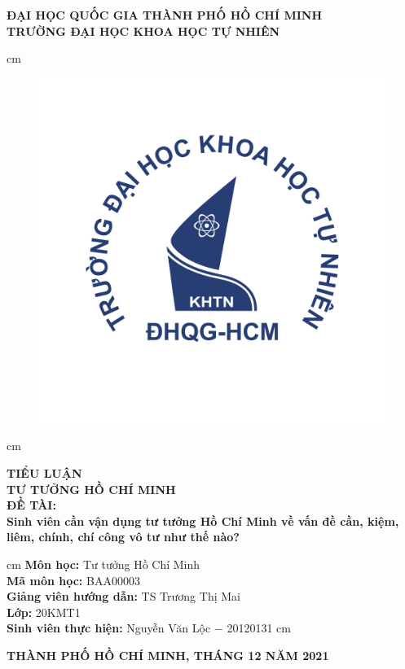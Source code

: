 \begin{titlepage}
\begin{mybox}
\begin{center}
\fontsize{12}{12}\selectfont
\textbf{ĐẠI HỌC QUỐC GIA THÀNH PHỐ HỒ CHÍ MINH}\\
\textbf{TRƯỜNG ĐẠI HỌC KHOA HỌC TỰ NHIÊN}
\end{center}
 cm
\begin{figure}[H]
\begin{center}
\includegraphics[scale=0.25]{figures/logo}
\end{center}
\end{figure}
 cm
\begin{center}
\fontsize{18}{14}\selectfont
\textbf{TIỂU LUẬN}\\
\fontsize{26}{16}\selectfont
\textbf{TƯ TƯỞNG HỒ CHÍ MINH}\\
\fontsize{18}{12}\selectfont
\textbf{ĐỀ TÀI: }\\
\textbf{Sinh viên cần vận dụng tư tưởng Hồ Chí Minh về vấn đề cần, kiệm, liêm, chính, chí công vô tư như thế nào?}
\end{center}
 cm
\fontsize{14}{12}\selectfont
\textbf{Môn học:} Tư tưởng Hồ Chí Minh\\
\textbf{Mã môn học:} BAA00003\\
\textbf{Giảng viên hướng dẫn:} TS Trương Thị Mai\\
\textbf{Lớp:} 20KMT1\\
\textbf{Sinh viên thực hiện:} Nguyễn Văn Lộc $-$ 20120131
 cm
\begin{center}
\textbf{THÀNH PHỐ HỒ CHÍ MINH, THÁNG 12 NĂM 2021}
\end{center}
\end{mybox}
\end{titlepage}